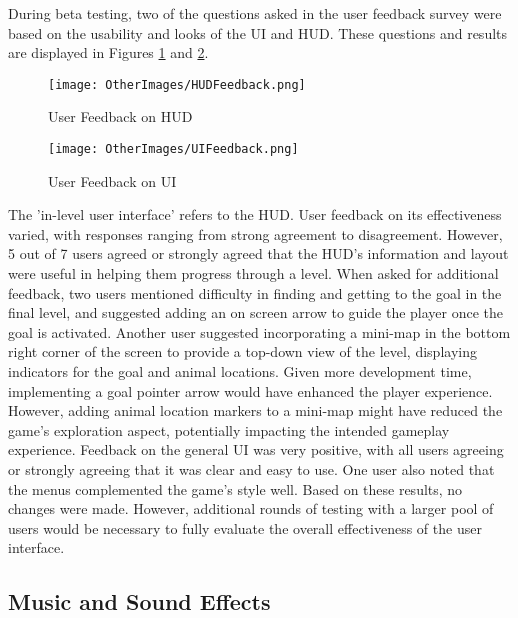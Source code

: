 \documentclass[10pt]{final_report}
\begin{document}
During beta testing, two of the questions asked in the user feedback survey were based on the usability and looks of the UI and HUD. These questions and results are displayed in Figures \ref{fig:label_HUDFeedback} and \ref{fig:label_UIFeedback}.
\begin{figure}[H]
    \centering
    \texttt{[image: OtherImages/HUDFeedback.png]}
    \caption{User Feedback on HUD}
    \label{fig:label_HUDFeedback}
\end{figure}
\begin{figure}[H]
    \centering
    \texttt{[image: OtherImages/UIFeedback.png]}
    \caption{User Feedback on UI}
    \label{fig:label_UIFeedback}
\end{figure}
The 'in-level user interface' refers to the HUD. User feedback on its effectiveness varied, with responses ranging from strong agreement to disagreement. However, 5 out of 7 users agreed or strongly agreed that the HUD's information and layout were useful in helping them progress through a level.
When asked for additional feedback, two users mentioned difficulty in finding and getting to the goal in the final level, and suggested adding an on screen arrow to guide the player once the goal is activated. Another user suggested incorporating a mini-map in the bottom right corner of the screen to provide a top-down view of the level, displaying indicators for the goal and animal locations.
Given more development time, implementing a goal pointer arrow would have enhanced the player experience. However, adding animal location markers to a mini-map might have reduced the game's exploration aspect, potentially impacting the intended gameplay experience.
\newline
Feedback on the general UI was very positive, with all users agreeing or strongly agreeing that it was clear and easy to use. One user also noted that the menus complemented the game's style well. Based on these results, no changes were made. However, additional rounds of testing with a larger pool of users would be necessary to fully evaluate the overall effectiveness of the user interface.

\subsection{Music and Sound Effects}
\end{document}
